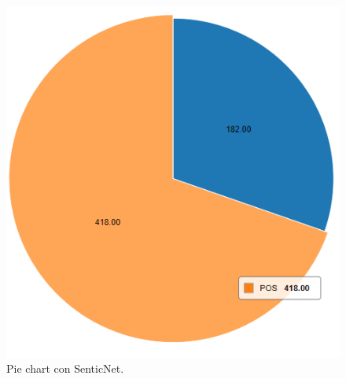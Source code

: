 \begin{figure}[H]
    \center\includegraphics[height=.4\linewidth]{img/analysis/pie3.png}
    \caption{Pie chart con SenticNet.}
\end{figure}